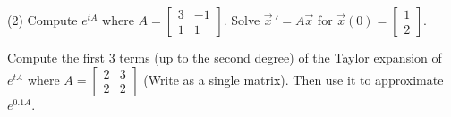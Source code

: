 \begin{exercise}
\pagebreak[2]
\leavevmode
\begin{tasks}(2)
\task
Compute
$e^{tA}$ where
$A=\left[ \begin{smallmatrix}
3 & -1 \\
1 & 1 
\end{smallmatrix}\right]$.
\task
Solve $\vec{x}\,' = A \vec{x}$
for $\vec{x}(0) =
\left[ \begin{smallmatrix}
1 \\ 2
\end{smallmatrix}\right]$.
\end{tasks}
\end{exercise}

\begin{exercise}
Compute the first 3 terms (up to the second degree) of the Taylor expansion of
$e^{tA}$ where
$A=\left[ \begin{smallmatrix}
2 & 3 \\
2 & 2 
\end{smallmatrix}\right]$ (Write as a single matrix).
Then use it to approximate $e^{0.1A}$.
\end{exercise}

